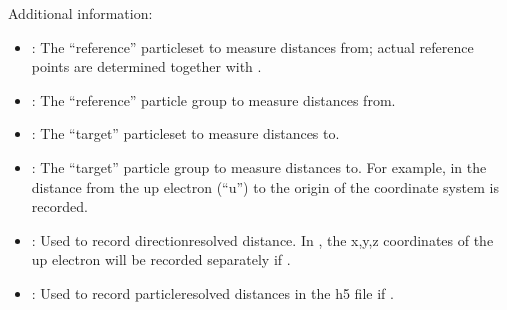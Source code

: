 \documentclass[letterpaper,10pt,english]{sphinxmanual}
\begin{document}
Additional information:
\begin{itemize}
\item {} 
: The “reference” particleset to measure distances from;
actual reference points are determined together with .

\item {} 
: The “reference” particle group to measure distances from.

\item {} 
: The “target” particleset to measure distances to.

\item {} 
: The “target” particle group to measure distances to. For
example, in {\hyperref[\detokenize{hamiltonianobservable:listing-32}]{}} the distance from the up
electron (“u”) to the origin of the coordinate system is recorded.

\item {} 
: Used to record direction\sphinxhyphen{}resolved distance. In
{\hyperref[\detokenize{hamiltonianobservable:listing-32}]{}}, the x,y,z coordinates of the up electron
will be recorded separately if .

\item {} 
: Used to record particle\sphinxhyphen{}resolved distances in the h5 file
if .

\end{itemize}
\def\sphinxLiteralBlockLabel{\label{\detokenize{hamiltonianobservable:listing-32}}}
\end{document}
